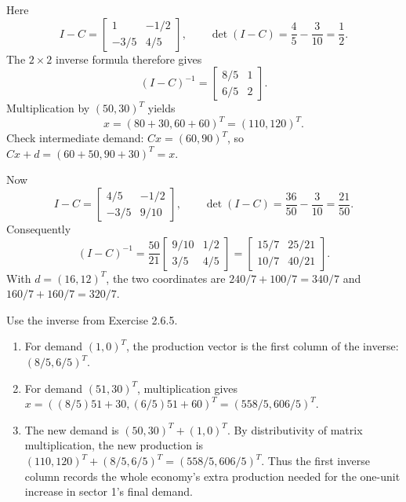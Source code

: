 Here
\[I-C=\begin{bmatrix}1&-1/2\\-3/5&4/5\end{bmatrix},\qquad
\det(I-C)=\frac45-\frac3{10}=\frac12.\]
The $2\times2$ inverse formula therefore gives
\[(I-C)^{-1}=\begin{bmatrix}8/5&1\\6/5&2\end{bmatrix}.\]
Multiplication by $(50,30)^T$ yields
\[x=(80+30,60+60)^T=(110,120)^T.\]
Check intermediate demand: $Cx=(60,90)^T$, so
$Cx+d=(60+50,90+30)^T=x$.

Now
\[I-C=\begin{bmatrix}4/5&-1/2\\-3/5&9/10\end{bmatrix},\qquad
\det(I-C)=\frac{36}{50}-\frac3{10}=\frac{21}{50}.\]
Consequently
\[(I-C)^{-1}=\frac{50}{21}
\begin{bmatrix}9/10&1/2\\3/5&4/5\end{bmatrix}
=\begin{bmatrix}15/7&25/21\\10/7&40/21\end{bmatrix}.\]
With $d=(16,12)^T$, the two coordinates are
$240/7+100/7=340/7$ and $160/7+160/7=320/7$.

Use the inverse from Exercise 2.6.5.
\begin{enumerate}[label=(\alph*)]
\item For demand $(1,0)^T$, the production vector is the first
column of the inverse: $(8/5,6/5)^T$.
\item For demand $(51,30)^T$, multiplication gives
$x=((8/5)51+30,(6/5)51+60)^T=(558/5,606/5)^T$.
\item The new demand is $(50,30)^T+(1,0)^T$. By distributivity of
matrix multiplication, the new production is
$(110,120)^T+(8/5,6/5)^T=(558/5,606/5)^T$.
Thus the first inverse column records the whole economy's extra
production needed for the one-unit increase in sector 1's final demand.
\end{enumerate}

